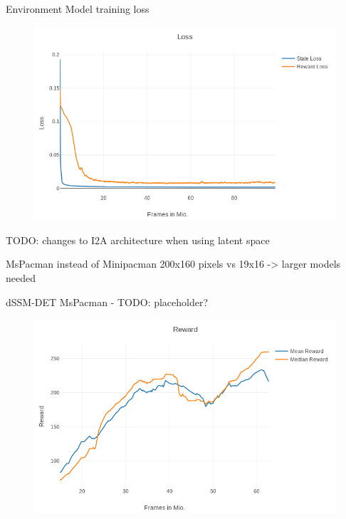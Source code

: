     
\begin{frame}{Environment Model training loss}
   \begin{figure}
       \centering
        \includegraphics[width=\textwidth]{./latent_i2a_images/EnvironmentModel_dSSM-DET_training.png}
    \end{figure}
\end{frame}




\begin{frame}
TODO: changes to I2A architecture when using latent space

MsPacman instead of Minipacman
200x160 pixels vs 19x16
-> larger models needed
\end{frame}

\begin{frame}{dSSM-DET MsPacman - TODO: placeholder?}
    \begin{figure}
        \centering
        \includegraphics[width=\textwidth]{./latent_i2a_images/dSSM_DET_MsPacman.png}
    \end{figure}
\end{frame}



